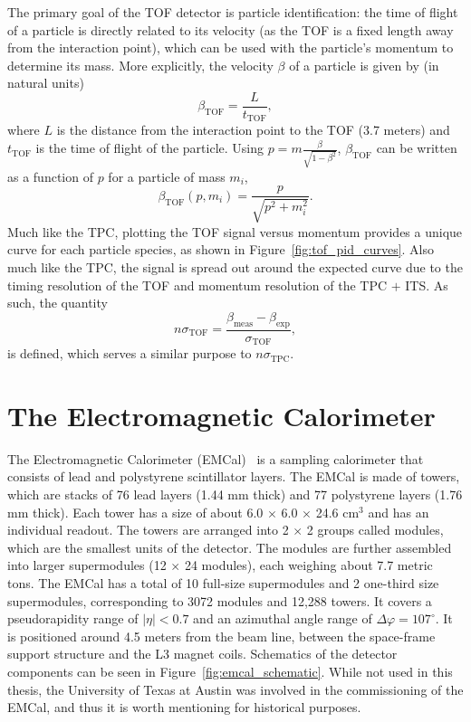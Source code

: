 The primary goal of the TOF detector is particle identification: the time of flight of a particle is directly related to its velocity (as the TOF is a fixed length away from the interaction point), which can be used with the particle's momentum to determine its mass. More explicitly, the velocity $\beta$ of a particle is given by (in natural units)
\begin{equation}
    \beta_{\text{TOF}} = \frac{L}{t_{\text{TOF}}},
\end{equation}
where $L$ is the distance from the interaction point to the TOF (3.7 meters) and $t_{\text{TOF}}$ is the time of flight of the particle. Using $p =  m \frac{\beta}{\sqrt{1-\beta^2}}$, $\beta_{\text{TOF}}$ can be written as a function of $p$ for a particle of mass $m_i$,
\begin{equation}
    \beta_{\text{TOF}}(p, m_i) = \frac{p}{\sqrt{p^2 + m_i^2}}.
\end{equation}
Much like the TPC, plotting the TOF signal versus momentum provides a unique curve for each particle species, as shown in Figure~\ref{fig:tof_pid_curves}. Also much like the TPC, the signal is spread out around the expected curve due to the timing resolution of the TOF and momentum resolution of the TPC $+$ ITS. As such, the quantity
\begin{equation}
n\sigma_{\text{TOF}} = \frac{\beta_{\text{meas}} - \beta_{\text{exp}}}{\sigma_{\text{TOF}}},
\end{equation}
is defined, which serves a similar purpose to $n\sigma_{\text{TPC}}$.



\section{The Electromagnetic Calorimeter}

The Electromagnetic Calorimeter (EMCal)~\cite{EMCAL1, EMCAL2} is a sampling calorimeter that consists of lead and polystyrene scintillator layers. The EMCal is made of towers, which are stacks of 76 lead layers (1.44 mm thick) and 77 polystyrene layers (1.76 mm thick). Each tower has a size of about 6.0 $\times$ 6.0 $\times$ 24.6 cm$^3$ and has an individual readout. The towers are arranged into 2 $\times$ 2 groups called modules, which are the smallest units of the detector. The modules are further assembled into larger supermodules (12 $\times$ 24 modules), each weighing about 7.7 metric tons. The EMCal has a total of 10 full-size supermodules and 2 one-third size supermodules, corresponding to 3072 modules and 12,288 towers. It covers a pseudorapidity range of $|\eta| < 0.7$ and an azimuthal angle range of  $\Delta\varphi = 107^\circ$. It is positioned around 4.5 meters from the beam line, between the space-frame support structure and the L3 magnet coils. Schematics of the detector components can be seen in Figure~\ref{fig:emcal_schematic}. While not used in this thesis, the University of Texas at Austin was involved in the commissioning of the EMCal, and thus it is worth mentioning for historical purposes.

